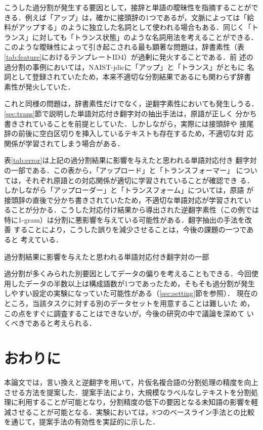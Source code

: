 \documentclass[japanese]{jnlp_1.4}
\begin{document}
こうした過分割が発生する要因として，接辞と単語の曖昧性を指摘することがで
きる．例えば「アップ」は，確かに接頭辞の1つであるが，文脈によっては「給
料がアップする」のように独立した名詞として使われる場合もある．同じく「ト
ランス」に対しても「トランス状態」のような名詞用法を考えることができる．
このような曖昧性によって引き起こされる最も顕著な問題は，辞書素性（表
\ref{tab:feature}におけるテンプレートID4）が過剰に発火することである．前
述の過分割の事例においては，NAIST-jdicに「アップ」と「トランス」がともに
名詞として登録されていたため，本来不適切な分割結果であるにも関わらず辞書
素性が発火していた．

これと同様の問題は，辞書素性だけでなく，逆翻字素性においても発生しうる．
\ref{sec:trans}節で説明した単語対応付き翻字対の抽出手法は，原語が正しく
分かち書きされていることを前提としていた．しかしながら，実際には接頭辞や
接尾辞の前後に空白区切りを挿入しているテキストも存在するため，不適切な対
応関係が学習されてしまう場合がある．

表\ref{tab:error}は上記の過分割結果に影響を与えたと思われる単語対応付き
翻字対の一部である．この表から，「アップロード」と「トランスフォーマー」
については，それぞれ原語との対応関係が適切に学習されていることが確認でき
る．しかしながら「アップローダー」と「トランスフォーム」については，原語
が接頭辞の直後で分かち書きされていたため，不適切な単語対応が学習されてい
ることが分かる．こうした対応付け結果から導出された逆翻字素性（この例では
特に1-gram）は分割に悪影響を与えている可能性がある．翻字抽出の手法を改善
することにより，こうした誤りを減少させることは，今後の課題の一つであると
考えている．

\begin{table}[t]
 \caption{過分割結果に影響を与えたと思われる単語対応付き翻字対の一部}
 \label{tab:error}

\end{table}

過分割が多くみられた別要因としてデータの偏りを考えることもできる．今回使
用したデータの半数以上は構成語数が1つであったため，そもそも過分割が発生
しやすい設定の実験になっていた可能性がある（\ref{sec:setting}節を参照）．
現在のところ，当該タスクに対する別のデータセットを用意することは難しいた
め，この点をすぐに調査することはできないが，今後の研究の中で議論を深めて
いくべきであると考えられる．


\section{おわりに} \label{sec:conclude}

本論文では，言い換えと逆翻字を用いて，片仮名複合語の分割処理の精度を向上
させる方法を提案した．提案手法により，大規模なラベルなしテキストを分割処
理に利用することが可能となり，分割精度の低下の要因となる未知語の影響を軽
減させることが可能となる．実験においては，8つのベースライン手法との比較
を通じて，提案手法の有効性を実証的に示した．
\end{document}
